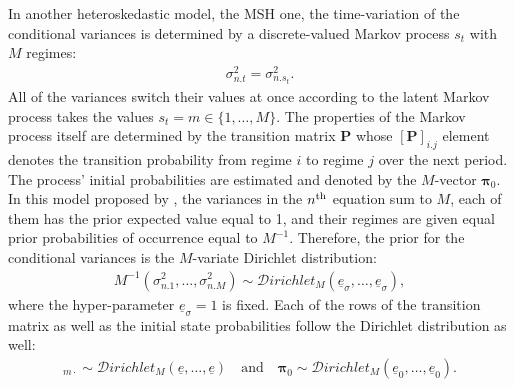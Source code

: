 \documentclass[
  nojss]{jss}
\begin{document}
In another heteroskedastic model, the MSH one, the time-variation of the
conditional variances is determined by a discrete-valued Markov process
\(s_t\) with \(M\) regimes: \begin{align}
\sigma_{n.t}^2 = \sigma_{n.s_t}^2.
\end{align} All of the variances switch their values at once according
to the latent Markov process takes the values
\(s_t = m\in\{1,\dots,M\}\). The properties of the Markov process itself
are determined by the transition matrix \(\mathbf{P}\) whose
\([\mathbf{P}]_{i.j}\) element denotes the transition probability from
regime \(i\) to regime \(j\) over the next period. The process' initial
probabilities are estimated and denoted by the \(M\)-vector
\(\boldsymbol{\pi}_0\). In this model proposed by
\cite{brunnermeier2021}, the variances in the \(n\textsuperscript{th}\)
equation sum to \(M\), each of them has the prior expected value equal
to 1, and their regimes are given equal prior probabilities of
occurrence equal to \(M^{-1}\). Therefore, the prior for the conditional
variances is the \(M\)-variate Dirichlet distribution: \begin{align}
M^{-1}\left(\sigma_{n.1}^2, \dots, \sigma_{n.M}^2\right) \sim\mathcal{D}irichlet_M(\underline{e}_\sigma, \dots, \underline{e}_\sigma), \label{eq:sigmaMSprior}
\end{align} where the hyper-parameter \(\underline{e}_\sigma = 1\) is
fixed. Each of the rows of the transition matrix as well as the initial
state probabilities follow the Dirichlet distribution as well:
\begin{align}
[\mathbf{P}]_{m\cdot} \sim\mathcal{D}irichlet_M(\underline{e}, \dots, \underline{e})\quad\text{and}\quad \boldsymbol{\pi}_0 \sim\mathcal{D}irichlet_M(\underline{e}_0, \dots, \underline{e}_0).
\end{align}
\end{document}
